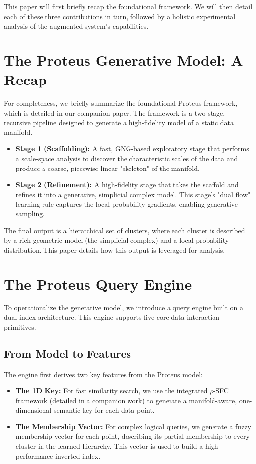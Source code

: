 \documentclass{article}
\begin{document}
This paper will first briefly recap the foundational framework. We will then detail each of these three contributions in turn, followed by a holistic experimental analysis of the augmented system's capabilities.

\section{The Proteus Generative Model: A Recap}

For completeness, we briefly summarize the foundational Proteus framework, which is detailed in our companion paper. The framework is a two-stage, recursive pipeline designed to generate a high-fidelity model of a static data manifold.

\begin{itemize}
    \item \textbf{Stage 1 (Scaffolding):} A fast, GNG-based exploratory stage that performs a scale-space analysis to discover the characteristic scales of the data and produce a coarse, piecewise-linear "skeleton" of the manifold.
    \item \textbf{Stage 2 (Refinement):} A high-fidelity stage that takes the scaffold and refines it into a generative, simplicial complex model. This stage's "dual flow" learning rule captures the local probability gradients, enabling generative sampling.
\end{itemize}

The final output is a hierarchical set of clusters, where each cluster is described by a rich geometric model (the simplicial complex) and a local probability distribution. This paper details how this output is leveraged for analysis.

\section{The Proteus Query Engine}

To operationalize the generative model, we introduce a query engine built on a dual-index architecture. This engine supports five core data interaction primitives.

\subsection{From Model to Features}
The engine first derives two key features from the Proteus model:
\begin{itemize}
    \item \textbf{The 1D Key:} For fast similarity search, we use the integrated $\rho$-SFC framework (detailed in a companion work) to generate a manifold-aware, one-dimensional semantic key for each data point.
    \item \textbf{The Membership Vector:} For complex logical queries, we generate a fuzzy membership vector for each point, describing its partial membership to every cluster in the learned hierarchy. This vector is used to build a high-performance inverted index.
\end{itemize}
\end{document}
